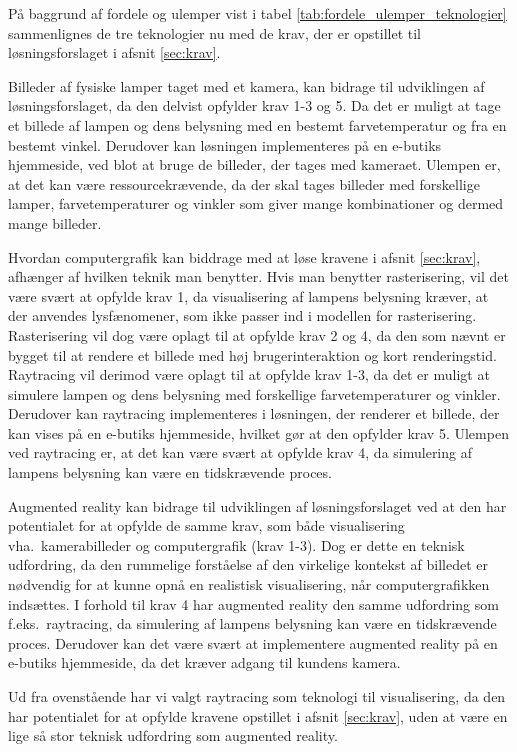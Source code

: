 På baggrund af fordele og ulemper vist i tabel \ref{tab:fordele_ulemper_teknologier} sammenlignes de tre teknologier nu med de krav, der er opstillet til løsningsforslaget i afsnit \ref{sec:krav}. 

Billeder af fysiske lamper taget med et kamera, kan bidrage til udviklingen af løsningsforslaget, da den delvist opfylder krav 1-3 og 5. Da det er muligt at tage et billede af lampen og dens belysning med en bestemt farvetemperatur og fra en bestemt vinkel. Derudover kan løsningen implementeres på en e-butiks hjemmeside, ved blot at bruge de billeder, der tages med kameraet. Ulempen er, at det kan være ressourcekrævende, da der skal tages billeder med forskellige lamper, farvetemperaturer og vinkler som giver mange kombinationer og dermed mange billeder.

Hvordan computergrafik kan biddrage med at løse kravene i afsnit \ref{sec:krav}, afhænger af hvilken teknik man benytter. Hvis man benytter rasterisering, vil det være svært at opfylde krav 1, da visualisering af lampens belysning kræver, at der anvendes lysfænomener, som ikke passer ind i modellen for rasterisering. Rasterisering vil dog være oplagt til at opfylde krav 2 og 4, da den som nævnt er bygget til at rendere et billede med høj brugerinteraktion og kort renderingstid.
Raytracing vil derimod være oplagt til at opfylde krav 1-3, da det er muligt at simulere lampen og dens belysning med forskellige farvetemperaturer og vinkler. Derudover kan raytracing implementeres i løsningen, der renderer et billede, der kan vises på en e-butiks hjemmeside, hvilket gør at den opfylder krav 5. Ulempen ved raytracing er, at det kan være svært at opfylde krav 4, da simulering af lampens belysning kan være en tidskrævende proces.

Augmented reality kan bidrage til udviklingen af løsningsforslaget ved at den har potentialet for at opfylde de samme krav, som både visualisering vha.\ kamerabilleder og computergrafik (krav 1-3). Dog er dette en teknisk udfordring, da den rummelige forståelse af den virkelige kontekst af billedet er nødvendig for at kunne opnå en realistisk visualisering, når computergrafikken indsættes. I forhold til krav 4 har augmented reality den samme udfordring som f.eks.\ raytracing, da simulering af lampens belysning kan være en tidskrævende proces. Derudover kan det være svært at implementere augmented reality på en e-butiks hjemmeside, da det kræver adgang til kundens kamera. 

Ud fra ovenstående har vi valgt raytracing som teknologi til visualisering, da den har potentialet for at opfylde kravene opstillet i afsnit \ref{sec:krav}, uden at være en lige så stor teknisk udfordring som augmented reality. 


\clearpage

